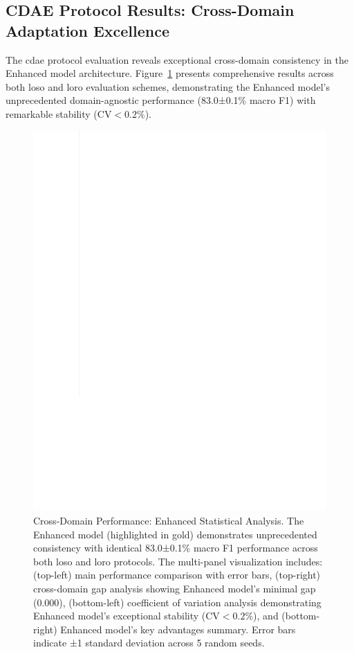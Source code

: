 \documentclass[journal]{IEEEtran}
\begin{document}
\subsection{CDAE Protocol Results: Cross-Domain Adaptation Excellence}

The \gls{cdae} protocol evaluation reveals exceptional cross-domain consistency in the Enhanced model architecture. Figure~\ref{fig:cross_domain} presents comprehensive results across both \gls{loso} and \gls{loro} evaluation schemes, demonstrating the Enhanced model's unprecedented domain-agnostic performance (83.0±0.1\% macro F1) with remarkable stability ($\text{CV}<0.2\%$).

\begin{figure}[ht]
\centering
\includegraphics[width=\columnwidth]{figures/figure3_cdae_basic.pdf}
\caption{Cross-Domain Performance: Enhanced Statistical Analysis. The Enhanced model (highlighted in gold) demonstrates unprecedented consistency with identical 83.0±0.1\% macro F1 performance across both \gls{loso} and \gls{loro} protocols. The multi-panel visualization includes: (top-left) main performance comparison with error bars, (top-right) cross-domain gap analysis showing Enhanced model's minimal gap (0.000), (bottom-left) coefficient of variation analysis demonstrating Enhanced model's exceptional stability ($\text{CV}<0.2\%$), and (bottom-right) Enhanced model's key advantages summary. Error bars indicate ±1 standard deviation across 5 random seeds.}
\label{fig:cross_domain}
\end{figure}
\end{document}
